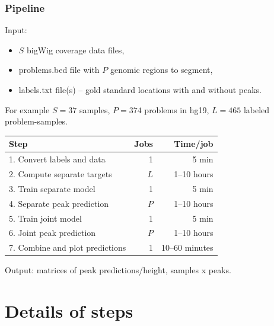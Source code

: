\documentclass{beamer}
\begin{document}

\begin{frame}
  \frametitle{Pipeline}
Input:
\begin{itemize}
\item $S$ bigWig coverage data files, 
\item problems.bed file with $P$ genomic regions to segment, 
\item labels.txt file(s) -- gold standard locations with and without peaks.
\end{itemize}
For example $S=37$ samples, $P=374$ problems in hg19, $L=465$ labeled
problem-samples.
  \vskip 0.2cm
  \begin{tabular}{lrr}
    Step& Jobs& Time/job \\
    \hline
    1. Convert labels and data & 1 & 5 min\\
    2. Compute separate targets & $L$ & 1--10 hours\\
    3. Train separate model & 1 & 5 min \\
    4. Separate peak prediction & $P$ & 1--10 hours\\
    5. Train joint model & 1 & 5 min \\
    6. Joint peak prediction & $P$ & 1--10 hours\\
    7. Combine and plot predictions & 1 & 10--60 minutes
  \end{tabular}
\vskip 0.2cm
Output: matrices of peak predictions/height, samples x peaks.
\end{frame}

\section{Details of steps}
\end{document}
